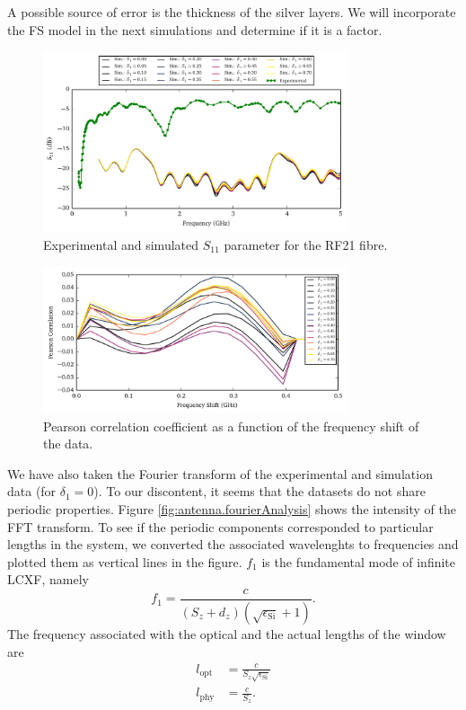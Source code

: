 A possible source of error is the thickness of the silver layers. We will incorporate
the FS model in the next simulations and determine if it is
a factor. 

\begin{figure}
 \centering
 \includegraphics[width=0.8\textwidth]{figs/active/sParameters-concSweepS11.pdf}
 \caption[Experimental and simulated $S_{11}$ parameter for the RF21 fibre]
	 {Experimental and simulated $S_{11}$ parameter for the RF21 fibre.}
 \label{fig:antenna.sParameters}
\end{figure}

\begin{figure}
 \centering
 \includegraphics[width=0.8\textwidth]{figs/active/shiftCorrelationS11.pdf}
 \caption{Pearson correlation coefficient as a function of the frequency
	  shift of the data.}
 \label{fig:antenna.shiftCorrelation}
\end{figure}

We have also taken the Fourier transform of the experimental
and simulation data (for $\delta_1=0$). To our discontent, 
it seems that the datasets do not share periodic properties. 
Figure \ref{fig:antenna.fourierAnalysis} shows the intensity
of the FFT transform. To see if the periodic components corresponded
to particular lengths in the system, we converted the associated
wavelenghts to frequencies and plotted them as vertical lines in the figure. 
$f_1$ is the fundamental mode of infinite LCXF, namely
  \begin{equation}
   f_1 = \frac{c}{\left(S_z+d_z\right)\left(\sqrt{\epsilon_\text{Si}}+1\right)}.
  \end{equation}
The frequency associated with the optical and the actual lengths of the window
are
  \begin{align*}
   l_\text{opt}	&= \frac{c}{S_z\sqrt{\epsilon_\text{Si}}}	\\
   l_\text{phy}	&= \frac{c}{S_z}.
  \end{align*}

